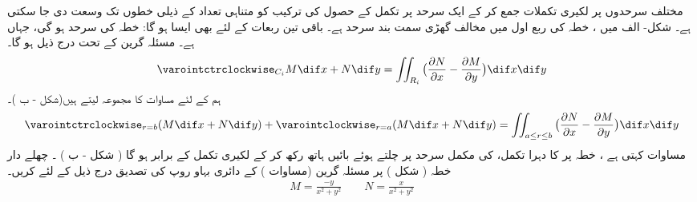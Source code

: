    مختلف سرحدوں پر لکیری تکملات  جمع کر کے ایک سرحد پر تکمل کے حصول کی ترکیب  کو متناہی تعداد کے ذیلی خطوں تک وسعت دی جا سکتی ہے۔ شکل- الف  میں ، خطہ   کی   ربع اول  میں  مخالف گھڑی سمت بند سرحد    ہے۔ باقی تین  ربعات کے لئے بھی ایسا ہو گا:    خطہ  کی سرحد   ہو گی، جہاں    ہے۔ مسئلہ  گرین کے تحت  درج ذیل ہو گا۔ 
\begin{align}\label{مساوات_سمتی_تکمل_چار_حصے}
     \varointctrclockwise_{C_i} M \dif x + N \dif y = \iint_{R_i} \big(\frac{\partial N}{\partial x} -  \frac{\partial M}{\partial y}\big) \dif x \dif y 
\end{align}
 ہم  کے لئے  مساوات      کا مجموعہ  لیتے ہیں(شکل    - ب )۔
\begin{align}\label{مساوات_سمتی_تکمل_چار_مجموعہ}
     \varointctrclockwise_{r=b} (M \dif x + N \dif y) + \varointclockwise_{r=a} (M \dif x + N \dif y) = \iint_{a\leq r \leq b} \big(\frac{\partial N}{\partial x} -  \frac{\partial M}{\partial y}\big) \dif x \dif y 
\end{align}
 مساوات      کہتی ہے   ،  خطہ 
  پر   کا دہرا  تکمل،   کی مکمل  سرحد پر چلتے ہوئے  بائیں ہاتھ رکھ کر   کے   لکیری تکمل   کے برابر ہو گا  ( شکل     - ب   )  ۔
 چھلے دار  خطہ  ( شکل    ) پر  مسئلہ  گرین (مساوات  ) کے  دائری بہاو روپ کی تصدیق  درج ذیل کے لئے کریں۔
\begin{align*}
  M = \frac{-y}{x^2 + y^2} \quad\quad N=\frac{x}{x^2 + y^2}  
\end{align*}

